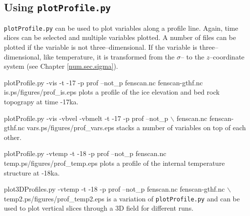 \subsection{Using \texttt{plotProfile.py}}
\texttt{plotProfile.py} can be used to plot variables along a profile line. Again, time slices can be selected and multiple variables plotted. A number of files can be plotted if the variable is not three--dimensional. If the variable is three--dimensional, like temperature, it is transformed from the $\sigma$-- to the $z$--coordinate system (see Chapter \ref{num.sec.sigma}).

\begin{pycf}{plotProfile.py -vis  -t -17 -p prof --not\_p fenscan.nc fenscan-gthf.nc is.ps}{\dir/figures/prof_is.eps}
  plots a profile of the ice elevation and bed rock topograpy at time -17ka.
\end{pycf}

\begin{pycf}{plotProfile.py -vis -vbvel -vbmelt -t -17 -p prof --not\_p $\backslash$ \newline   fenscan.nc fenscan-gthf.nc vars.ps}{\dir/figures/prof_vars.eps}
  stacks a number of variables on top of each other.
\end{pycf}

\begin{pycf}{plotProfile.py -vtemp  -t -18 -p prof --not\_p fenscan.nc temp.ps}{\dir/figures/prof_temp.eps}
  plots a profile of the internal temperature structure at -18ka.
\end{pycf}

\begin{pycf}{plot3DProfiles.py -vtemp  -t -18 -p prof --not\_p fenscan.nc fenscan-gthf.nc $\backslash$ \newline temp2.ps}{\dir/figures/prof_temp2.eps}
is a variation of \texttt{plotProfile.py} and can be used to plot vertical slices through a 3D field for different runs.
\end{pycf}
